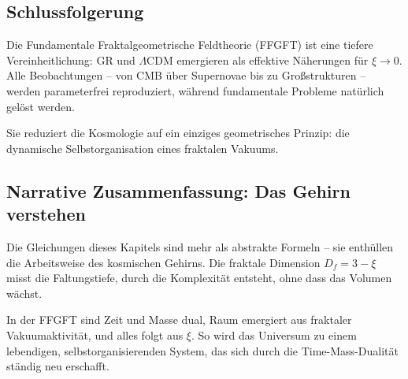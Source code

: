 	\subsection*{Schlussfolgerung}
	
	Die Fundamentale Fraktalgeometrische Feldtheorie (FFGFT) ist eine tiefere Vereinheitlichung: GR und \(\Lambda\)CDM emergieren als effektive Näherungen für \(\xi \to 0\). Alle Beobachtungen – von CMB über Supernovae bis zu Großstrukturen – werden parameterfrei reproduziert, während fundamentale Probleme natürlich gelöst werden.
	
	Sie reduziert die Kosmologie auf ein einziges geometrisches Prinzip: die dynamische Selbstorganisation eines fraktalen Vakuums.
	
	\subsection*{Narrative Zusammenfassung: Das Gehirn verstehen}
	
	Die Gleichungen dieses Kapitels sind mehr als abstrakte Formeln – sie enthüllen die Arbeitsweise des kosmischen Gehirns. Die fraktale Dimension \(D_f = 3 - \xi\) misst die Faltungstiefe, durch die Komplexität entsteht, ohne dass das Volumen wächst.
	
	In der FFGFT sind Zeit und Masse dual, Raum emergiert aus fraktaler Vakuumaktivität, und alles folgt aus \(\xi\). So wird das Universum zu einem lebendigen, selbstorganisierenden System, das sich durch die Time-Mass-Dualität ständig neu erschafft.



